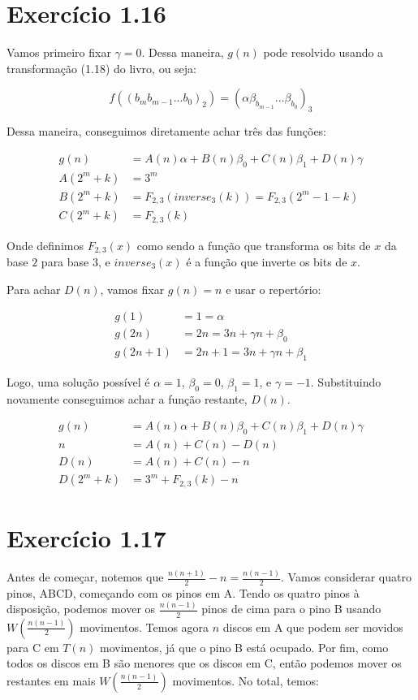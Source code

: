 \documentclass[10pt]{book}
\begin{document}
\section{  Exercício 1.16 }

Vamos primeiro fixar $\gamma=0$. Dessa maneira, $g(n)$ pode resolvido usando 
a transformação (1.18) do livro, ou seja:

\[ f((b_m b_{m-1} ... b_0)_2) = 
   (\alpha \beta_{b_{m-1}} ... \beta_{b_0})_3 \]

Dessa maneira, conseguimos diretamente achar três das funções:

\begin{align*}
  g(n) &= A(n)\alpha + B(n)\beta_0 + C(n)\beta_1 + D(n)\gamma \\
  A(2^m+k) &= 3^m \\
  B(2^m+k) &= F_{2,3}(inverse_3(k)) = F_{2,3}(2^m-1-k) \\
  C(2^m+k) &= F_{2,3}(k)
\end{align*}

Onde definimos $F_{2,3}(x)$ como sendo a função que transforma os bits de $x$ da base $2$ para base $3$, e $inverse_3(x)$ é a função que inverte os bits de $x$.

Para achar $D(n)$, vamos fixar $g(n)=n$ e usar o repertório:

\begin{align*}
  g(1) &= 1 = \alpha \\
  g(2n) &= 2n = 3n + \gamma n + \beta_0 \\
  g(2n+1) &= 2n+1 = 3n + \gamma n + \beta_1
\end{align*}

Logo, uma solução possível é $\alpha=1$, $\beta_0=0$, $\beta_1=1$, e $\gamma=-1$. Substituindo novamente conseguimos achar a função restante, $D(n)$.

\begin{align*}
  g(n) &= A(n)\alpha + B(n)\beta_0 + C(n)\beta_1 + D(n)\gamma \\
  n &= A(n) + C(n) - D(n) \\
  D(n) &= A(n) + C(n) - n  \\
  D(2^m+k) &= 3^m + F_{2,3}(k) -n
\end{align*}

\section{  Exercício 1.17 }

Antes de começar, notemos que $\frac{n(n+1)}{2} - n = \frac{n(n-1)}{2}$. 
Vamos considerar quatro pinos, ABCD, começando com os pinos em A. Tendo os 
quatro pinos à disposição, podemos mover os $\frac{n(n-1)}{2}$ pinos de cima 
para o pino B usando $W\left(\frac{n(n-1)}{2}\right)$ movimentos. 
Temos agora $n$ discos em A que podem ser movidos para C em 
$T(n)$ movimentos, já que o pino B está ocupado. Por fim, como todos os discos em B são menores que os discos em C, então podemos mover os restantes em 
mais $W\left(\frac{n(n-1)}{2}\right)$ movimentos. No total, temos:
\end{document}
